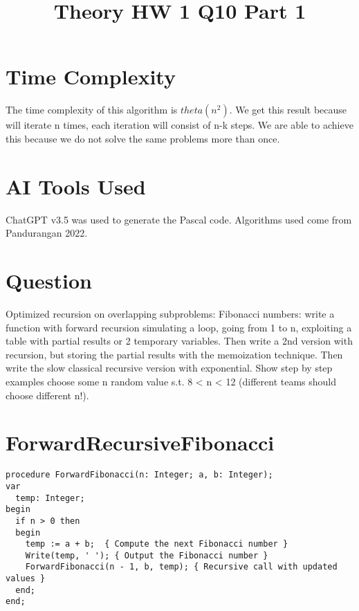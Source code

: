 \documentclass[conference]{IEEEtran}
\begin{document}
\section{Time Complexity}
The time complexity of this algorithm is $theta(n^2)$. We get this result because will iterate n times, each iteration will consist of n-k steps. We are able to achieve this because we do not solve the same problems more than once.

\section{AI Tools Used}
ChatGPT v3.5 was used to generate the Pascal code. Algorithms used come from Pandurangan 2022.

\title{Theory HW 1 Q10 Part 1}

\author{
}

\maketitle

\section{Question}
%
Optimized recursion on overlapping subproblems:
Fibonacci numbers: write a function with forward recursion simulating a loop, going from 1 to
n, exploiting a table with partial results or 2 temporary variables. Then write a 2nd version with
recursion, but storing the partial results with the memoization technique. Then write the slow
classical recursive version with exponential. Show step by step examples choose some n
random value s.t. 8 < n < 12 (different teams should choose different n!).




\section{ForwardRecursiveFibonacci}

\begin{verbatim}
procedure ForwardFibonacci(n: Integer; a, b: Integer);
var
  temp: Integer;
begin
  if n > 0 then
  begin
    temp := a + b;  { Compute the next Fibonacci number }
    Write(temp, ' '); { Output the Fibonacci number }
    ForwardFibonacci(n - 1, b, temp); { Recursive call with updated values }
  end;
end;
\end{verbatim}
\end{document}
